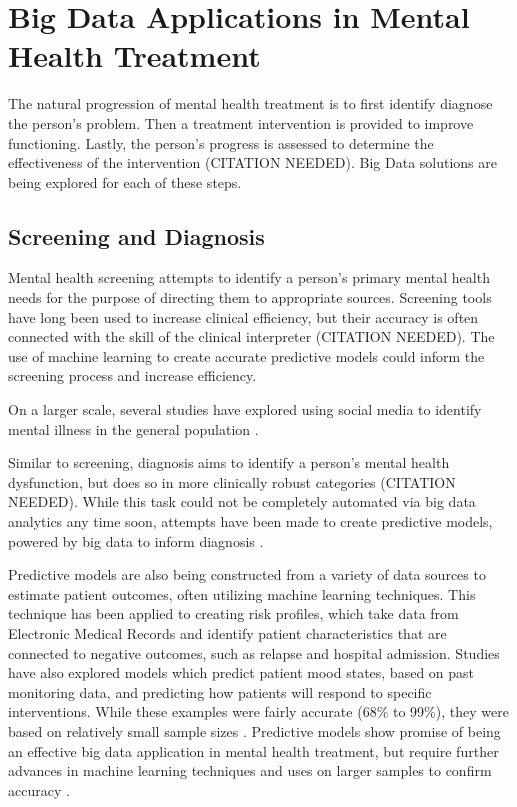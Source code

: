 \documentclass[sigconf]{acmart}
\begin{document}
\section{Big Data Applications in Mental Health Treatment}
The natural progression of mental health treatment is to first identify diagnose the person's problem. Then a treatment intervention is provided to improve functioning. Lastly, the person's progress is assessed to determine the effectiveness of the intervention (CITATION NEEDED). Big Data solutions are being explored for each of these steps.
\subsection{Screening and Diagnosis}
Mental health screening attempts to identify a person's primary mental health needs for the purpose of directing them to appropriate sources. Screening tools have long been used to increase clinical efficiency, but their accuracy is often connected with the skill of the clinical interpreter (CITATION NEEDED). The use of machine learning to create accurate predictive models could inform the screening process and increase efficiency. 

On a larger scale, several studies have explored using social media to identify mental illness in the general population \cite{detectdepressionsocialmedia}.

Similar to screening, diagnosis aims to identify a person's mental health dysfunction, but does so in more clinically robust categories (CITATION NEEDED). While this task could not be completely automated via big data analytics any time soon, attempts have been made to create predictive models, powered by big data to inform diagnosis \cite{machinelearnbipolar} \cite{bigdatabipolar}.

Predictive models are also being constructed from a variety of data sources to estimate patient outcomes, often utilizing machine learning techniques. \cite{bigdatabipolar} This technique has been applied to creating risk profiles, which take data from Electronic Medical Records and identify patient characteristics that are connected to negative outcomes, such as relapse and hospital admission. Studies have also explored models which predict patient mood states, based on past monitoring data, and predicting how patients will respond to specific interventions. While these examples were fairly accurate (68\% to 99\%), they were based on relatively small sample sizes \cite{machinelearnbipolar}.  Predictive models show promise of being an effective big data application in mental health treatment, but require further advances in machine learning techniques and uses on larger samples to confirm accuracy \cite{bigdatabipolar}.
\end{document}
